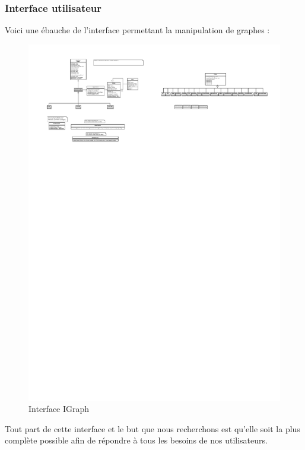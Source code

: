 \documentclass[french]{article}
\begin{document}
			\subsubsection{Interface utilisateur}
			Voici une ébauche de l'interface permettant la manipulation de graphes :
			\begin{figure}[H]
				\centering
				\includegraphics[scale=3.0]{Conception/igraph.pdf}
				\caption{Interface IGraph}
			\end{figure}
			Tout part de cette interface et le but que nous recherchons est qu'elle soit la plus complète possible afin de répondre à tous les besoins de nos utilisateurs. \\
			
\end{document}
